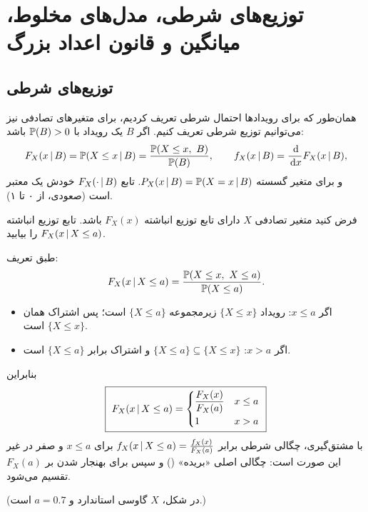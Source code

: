 \chapter{توزیع‌های شرطی، مدل‌های مخلوط، میانگین و قانون اعداد بزرگ}

\section{توزیع‌های شرطی }

همان‌طور که برای رویدادها احتمال شرطی تعریف کردیم، برای متغیرهای تصادفی نیز می‌توانیم توزیع شرطی تعریف کنیم. اگر $B$ یک رویداد با $\mathbb{P}(B)>0$ باشد:
\[
F_X(x\,|\, B)=\mathbb{P}(X\le x\,|\, B)=\frac{\mathbb{P}(X\le x,\ B)}{\mathbb{P}(B)},\qquad
f_X(x\,|\, B)=\frac{\,\mathrm{d}}{\,\mathrm{d} x}F_X(x\,|\, B),
\]
و برای متغیر گسسته $P_X(x\,|\, B)=\mathbb{P}(X=x\,|\, B)$. تابع $F_X(\cdot\,|\, B)$ خودش یک  معتبر است (صعودی، از ۰ تا ۱).

\begin{example}
فرض کنید متغیر تصادفی $X$ دارای تابع توزیع انباشته $F_X(x)$ باشد. تابع توزیع انباشته $F_X(x\,|\, X\le a)$ را بیابید.
\begin{solution}
طبق تعریف:
\[
F_X(x\,|\, X\le a)=\frac{\mathbb{P}(X\le x,\ X\le a)}{\mathbb{P}(X\le a)} .
\]
\begin{itemize}
\item اگر $x\le a$: رویداد $\{X\le x\}$ زیرمجموعه $\{X\le a\}$ است؛ پس اشتراک همان $\{X\le x\}$ است.
\item اگر $x>a$: $\{X\le a\}\subseteq\{X\le x\}$ و اشتراک برابر $\{X\le a\}$ است.
\end{itemize}
بنابراین
\[
\boxed{\ F_X(x\,|\, X\le a)=\begin{cases}\dfrac{F_X(x)}{F_X(a)} & x\le a\\[2mm] 1 & x>a\end{cases}\ }
\]
با مشتق‌گیری، چگالی شرطی برابر $f_X(x\,|\, X\le a)=\frac{f_X(x)}{F_X(a)}$ برای $x\le a$ و صفر در غیر این صورت است: چگالی اصلی «بریده» () و سپس برای بهنجار شدن بر $F_X(a)$ تقسیم می‌شود.
\end{solution}
\end{example}

\begin{center}
\end{center}
(در شکل، $X$ گاوسی استاندارد و $a=0.7$ است.)

